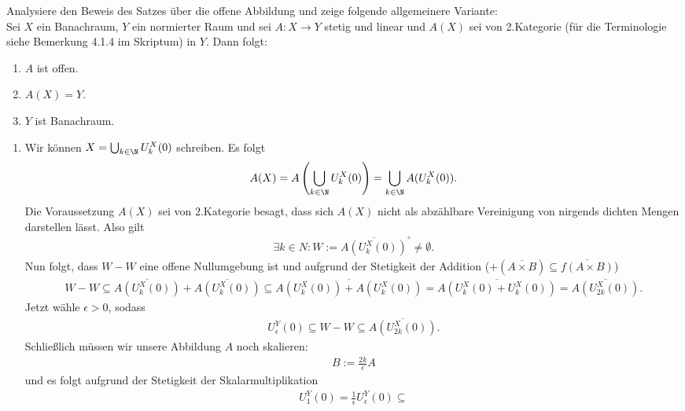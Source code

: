 \begin{exercise}
Analysiere den Beweis des Satzes über die offene Abbildung und zeige folgende
allgemeinere Variante: \\
Sei $X$ ein Banachraum, $Y$ ein normierter Raum und sei $A: X \rightarrow Y$ stetig
und linear und $A(X)$ sei von 2.Kategorie (für die Terminologie siehe Bemerkung
4.1.4 im Skriptum) in $Y$. Dann folgt:
\begin{enumerate}[label = (\roman*)]
  \item $A$ ist offen.
  \item $A(X) = Y$.
  \item $Y$ ist Banachraum.
\end{enumerate}
\end{exercise}
\begin{solution}
\begin{enumerate}[label = (\roman*)]
  \item
  Wir können $X = \bigcup_{k \in \N} U_k^X(0)$ schreiben. Es folgt
  \begin{align*}
    A(X) = A\left(\bigcup_{k \in \N} U_k^X(0)\right)
    = \bigcup_{k \in \N}A(U_k^X(0)).
  \end{align*}
  Die Voraussetzung $A(X)$ sei von 2.Kategorie besagt, dass sich $A(X)$
  nicht als abzählbare Vereinigung von nirgends dichten Mengen darstellen lässt.
  Also gilt
  \begin{align*}
    \exists k \in N: W := \overline{A(U_k^X(0))}^{\circ} \neq \emptyset.
  \end{align*}
  Nun folgt, dass $W - W$ eine offene Nullumgebung ist und aufgrund der Stetigkeit
  der Addition ($+(\overline{A \times B}) \subseteq \overline{f(A \times B)}$)
  \begin{align*}
    W - W \subseteq \overline{A(U_k^X(0))} + \overline{A(U_k^X(0))}
    \subseteq \overline{A(U_k^X(0)) + A(U_k^X(0))}
    = \overline{A(U_k^X(0) + U_k^X(0))}
    = \overline{A(U_{2k}^X(0))}.
  \end{align*}
  Jetzt wähle $\epsilon > 0$, sodass
  \begin{align*}
    U_{\epsilon}^Y(0) \subseteq W - W \subseteq \overline{A(U_{2k}^X(0))}.
  \end{align*}
  Schließlich müssen wir unsere Abbildung $A$ noch skalieren:
  \begin{align*}
    B := \frac{2k}{\epsilon}A
  \end{align*}
  und es folgt aufgrund der Stetigkeit der Skalarmultiplikation
  \begin{align*}
    U_1^Y(0) = \frac{1}{\epsilon}U_{\epsilon}^Y(0) \subseteq

\end{align*}
\end{enumerate}
\end{solution}
